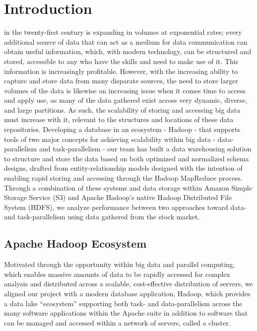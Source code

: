\documentclass[journal]{IEEEtran}
\begin{document}
%
\IEEEpeerreviewmaketitle



\section{Introduction}

 in the twenty-first century is expanding in volumes
 at exponential rates; every additional source of data that can act as a
 medium for data communication can obtain useful information, which,
 with modern technology, can be structured and stored, accessible to any
 who have the skills and need to make use of it. 
This information is increasingly profitable. 
However, with the increasing ability to capture and store data from many
 disparate sources, the need to store larger volumes of the data is
 likewise an increasing issue when it comes time to access and apply use,
 as many of the data gathered exist across very dynamic, diverse, and
 large partitions. 
As such, the scalability of storing and accessing big data must increase
 with it, relevant to the structures and locations of these data repositories. 
Developing a database in an ecosystem - Hadoop - that supports tools of
 two major concepts for achieving scalability within big data -
 data-parallelism and task-parallelism - our team has built a data
 warehousing solution to structure and store the data based on both
 optimized and normalized schema designs, drafted from entity-relationship
 models designed with the intention of enabling rapid storing and accessing
 through the Hadoop MapReduce process. 
Through a combination of these systems and data storage within
 Amazon Simple Storage Service (S3) and Apache Hadoop's native Hadoop
 Distributed File System (HDFS), we analyze performance between two
 approaches toward data- and task-parallelism using data gathered from
 the stock market.

\subsection{Apache Hadoop Ecosystem}
Motivated through the opportunity within big data and parallel computing,
 which enables massive amounts of data to be rapidly accessed for complex
 analysis and distributed across a scalable, cost-effective distribution of
 servers, we aligned our project with a modern database application, Hadoop,
 which provides a data lake ``ecosystem'' supporting both task- and
 data-parallelism across the many software applications within the Apache
 suite in addition to software that can be managed and accessed within
 a network of servers, called a cluster.
\end{document}
